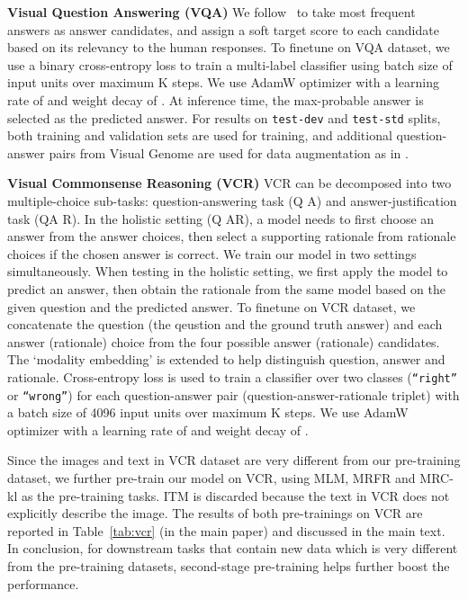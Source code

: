 \documentclass[runningheads]{llncs}
\begin{document}
\vspace{5pt}
\noindent \textbf{Visual Question Answering (VQA)} 
We follow~\cite{Yu_2019_CVPR} to take  most frequent answers as answer candidates, and assign a soft target score to each candidate based on its relevancy to the  human responses. To finetune on VQA dataset, we use a binary cross-entropy loss to train a multi-label classifier using batch size of  input units over maximum K steps. We use AdamW optimizer \cite{AdamW} with a learning rate of  and weight decay of . At inference time, the max-probable answer is selected as the predicted answer. For results on \texttt{test-dev} and \texttt{test-std} splits, both training and validation sets are used for training, and additional question-answer pairs from Visual Genome are used for data augmentation as in \cite{Yu_2019_CVPR}. 


\vspace{5pt}
\noindent \textbf{Visual Commonsense Reasoning (VCR)} 
VCR can be decomposed into two multiple-choice sub-tasks: question-answering task (Q  A) and answer-justification task (QA  R). In the holistic setting (Q  AR), a model needs to first choose an answer from the answer choices, then select a supporting rationale from rationale choices if the chosen answer is correct. We train our model in two settings simultaneously. When testing in the holistic setting, we first apply the model to predict an answer, then obtain the rationale from the same model based on the given question and the predicted answer. To finetune on VCR dataset, we concatenate the question (the qeustion and the ground truth answer) and each answer (rationale) choice  from the four possible answer (rationale) candidates. The `modality embedding' is extended to help distinguish question, answer and rationale. Cross-entropy loss is used to train a classifier over two classes (\texttt{``right''} or \texttt{``wrong''}) for each question-answer pair (question-answer-rationale triplet) with a batch size of 4096 input units over maximum K steps. We use AdamW optimizer with a learning rate of  and weight decay of . 

Since the images and text in VCR dataset are very different from our pre-training dataset, we further pre-train our model on VCR, using MLM, MRFR and MRC-kl as the pre-training tasks. ITM is discarded because the text in VCR does not explicitly describe the image. The results of both pre-trainings on VCR are reported in Table~\ref{tab:vcr} (in the main paper) and discussed in the main text. In conclusion, for downstream tasks that contain new data which is very different from the pre-training datasets, second-stage pre-training helps further boost the performance. 
\end{document}
